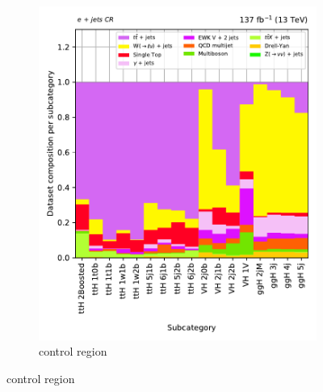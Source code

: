 \begin{figure}[htbp]
\begin{subfigure}[b]{0.3\textwidth}
        \includegraphics[width=\textwidth]{figures/region_plots/full_Run2/region_3/background_composition.pdf}
        \caption{\singleEleCr control region}
    \end{subfigure}


\end{figure}

